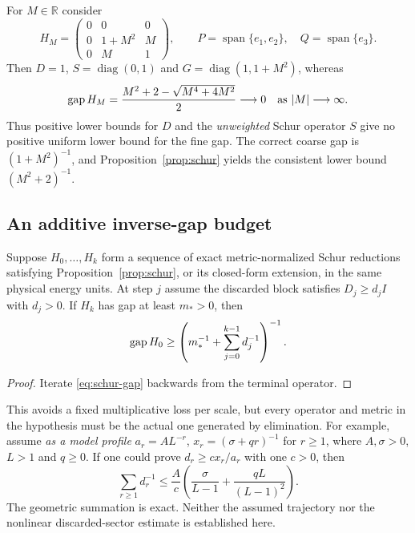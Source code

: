 For $M\in\mathbb R$ consider
\begin{equation}
 H_M=\begin{pmatrix}
 0&0&0\\
 0&1+M^2&M\\
 0&M&1
 \end{pmatrix},\qquad
 P=\operatorname{span}\{e_1,e_2\},\quad Q=\operatorname{span}\{e_3\}.
\end{equation}
Then $D=1$, $S=\operatorname{diag}(0,1)$ and
$G=\operatorname{diag}(1,1+M^2)$, whereas
\begin{equation}
 \operatorname{gap} H_M=\frac{M^2+2-\sqrt{M^4+4M^2}}2\longrightarrow0
 \quad\text{as }|M|\longrightarrow\infty .
\end{equation}
Thus positive lower bounds for $D$ and the \emph{unweighted} Schur
operator $S$ give no positive uniform lower bound for the fine gap.
The correct coarse gap is $(1+M^2)^{-1}$, and
Proposition~\ref{prop:schur} yields the consistent lower bound
$(M^2+2)^{-1}$.

\subsection{An additive inverse-gap budget}

\begin{corollary}\label{cor:multiscale}
Suppose $H_0,\ldots,H_k$ form a sequence of exact metric-normalized
Schur reductions satisfying Proposition~\ref{prop:schur}, or its
closed-form extension, in the same physical energy units. At step $j$
assume the discarded block satisfies $D_j\ge d_jI$ with $d_j>0$.
If $H_k$ has gap at least $m_*>0$, then
\begin{equation}\label{eq:budget}
 \operatorname{gap} H_0\ge
 \left(m_*^{-1}+\sum_{j=0}^{k-1}d_j^{-1}\right)^{-1}.
\end{equation}
\end{corollary}
\begin{proof}
Iterate \eqref{eq:schur-gap} backwards from the terminal operator.
\end{proof}

This avoids a fixed multiplicative loss per scale, but every operator and
metric in the hypothesis must be the actual one generated by elimination.
For example, assume \emph{as a model profile}
$a_r=AL^{-r}$, $x_r=(\sigma+qr)^{-1}$ for $r\ge1$,
where $A,\sigma>0$, $L>1$ and $q\ge0$. If one could prove
$d_r\ge cx_r/a_r$ with one $c>0$, then
\begin{equation}
 \sum_{r\ge1}d_r^{-1}
 \le\frac{A}{c}\left(\frac{\sigma}{L-1}
                   +\frac{qL}{(L-1)^2}\right).
\end{equation}
The geometric summation is exact. Neither the assumed trajectory nor
the nonlinear discarded-sector estimate is established here.

